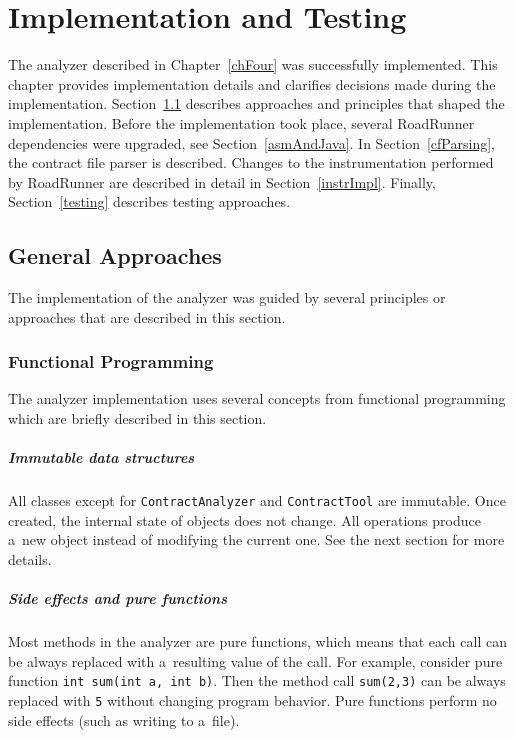 \chapter{Implementation and Testing}
\label{chFive}

The analyzer described in Chapter~\ref{chFour} was successfully implemented.
This chapter provides implementation details and clarifies decisions made during
the implementation. Section~\ref{approaches} describes approaches and principles
that shaped the implementation. Before the implementation took place, several
RoadRunner dependencies were upgraded, see Section~\ref{asmAndJava}. In
Section~\ref{cfParsing}, the contract file parser is described. Changes to the
instrumentation performed by RoadRunner are described in detail in
Section~\ref{instrImpl}. Finally, Section~\ref{testing} describes testing
approaches.

\section{General Approaches}
\label{approaches}
The implementation of the analyzer was guided by several principles or
approaches that are described in this section.

\subsection{Functional Programming}
The analyzer implementation uses several concepts from functional programming
which are briefly described in this section.

\paragraph{Immutable data structures}
All classes except for \texttt{ContractAnalyzer} and \texttt{ContractTool} are
immutable. Once created, the internal state of objects does not change. All
operations produce a~new object instead of modifying the current one. See the
next section for more details.

\paragraph{Side effects and pure functions}
Most methods in the analyzer are pure functions, which means that each call can
be always replaced with a~resulting value of the call. For example, consider
pure function \texttt{int sum(int a, int b)}. Then the method call
\texttt{sum(2,3)} can be always replaced with \texttt{5} without changing
program behavior. Pure functions perform no side effects (such as writing to
a~file).

